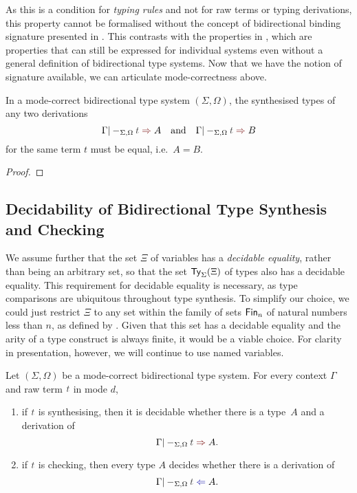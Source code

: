 \begin{remark}
  As this is a condition for \emph{typing rules} and not for raw terms or typing derivations, this property cannot be formalised without the concept of bidirectional binding signature presented in .
  This contrasts with the properties in , which are properties that can still be expressed for individual systems even without a general definition of bidirectional type systems.
  Now that we have the notion of signature available, we can articulate mode-correctness above.
\end{remark}

\begin{lemma}\label{thm:unique-syn}
  In a mode-correct bidirectional type system $(\Sigma, \Omega)$, the synthesised types of any two derivations
  \[
    \Gamma |-_{\Sigma, \Omega} \isTerm{t} \syn A
    \quad\text{and}\quad
    \Gamma |-_{\Sigma, \Omega} \isTerm{t} \syn B
  \]
  for the same term $t$ must be equal, i.e.\ $A = B$.
\end{lemma}
 
\begin{proof}
  
\end{proof}



\subsection{Decidability of Bidirectional Type Synthesis and Checking}\label{subsec:bidirectional-synthesis-checking}

We assume further that the set $\Xi$ of variables has a \emph{decidable equality}, rather than being an arbitrary set, so that the set $\mathsf{Ty}_{\Sigma}(\Xi)$ of types also has a decidable equality.
This requirement for decidable equality is necessary, as type comparisons are ubiquitous throughout type synthesis.
To simplify our choice, we could just restrict $\Xi$ to any set within the family of sets $\mathsf{Fin}_n$ of natural numbers less than $n$, as defined by \citet{Dybjer1994}.
Given that this set has a decidable equality and the arity of a type construct is always finite, it would be a viable choice.
For clarity in presentation, however, we will continue to use named variables.

\begin{theorem} \label{thm:bidirectional-type-synthesis-checking}
  Let $(\Sigma, \Omega)$ be a mode-correct bidirectional type system.
  For every context $\Gamma$ and raw term $\isTerm{t}$ in mode $d$, 
  \begin{enumerate}
    \item if $\isTerm{t}$ is synthesising, then it is decidable whether there is a type~$A$ and a derivation of
      \[
        \Gamma |-_{\Sigma, \Omega} \isTerm{t} \syn A.
      \]
    \item if $\isTerm{t}$ is checking, then every type $A$ decides whether there is a derivation of
      \[
        \Gamma |-_{\Sigma, \Omega} \isTerm{t} \chk A.
      \]
  \end{enumerate}
\end{theorem}


